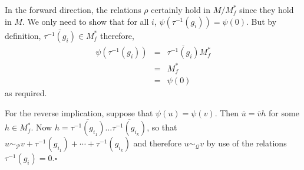 \documentclass{acmconf}
\begin{document}
In the forward direction, the relations $\rho$ certainly hold in 
$M/M^*_f$ since they hold in $M$. We only need to show that 
for all $i$, $\psi(\tau^{-1}(g_i)) = \psi(0)$. But by definition,
$\overline{\tau^{-1}(g_i)} \in M^*_f$ therefore, 
\begin{eqnarray*}
\psi(\tau^{-1}(g_i))& = & \overline{\tau^{-1}(g_i)}M^*_f \\
										& = & M^*_f \\
										& = & \psi(0)
\end{eqnarray*}
as required.

For the reverse implication, suppose 
that $\psi(u) = \psi(v)$. Then
$\overline{u} = \overline{v} h$ for some $h \in M^*_f$.
Now $h = \overline{\tau^{-1}(g_{i_1})} \ldots \overline{\tau^{-1}(g_{i_k})}$,
so that 
$u \sim_\mathcal{P} v + \tau^{-1}(g_{i_1}) + \cdots + \tau^{-1}(g_{i_k})$
and therefore $u \sim_\mathcal{Q} v$ by use of the relations
$\tau^{-1}(g_{i}) = 0$.$\square$
\end{document}
